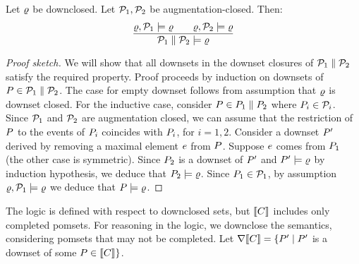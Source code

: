 \begin{proposition}%
  Let $\varrho$ be downclosed.  Let $\mathcal{P}_1, \mathcal{P}_2$ be
  augmentation\hyp{}closed. %
  Then:
  \begin{displaymath}
    \frac{
      \varrho, \mathcal{P}_1 \models\varrho
      \qquad
      \varrho, \mathcal{P}_2 \models\varrho
    }{\mathcal{P}_1 \parallel \mathcal{P}_2 \models \varrho}
  \end{displaymath}
\end{proposition}
\begin{proof}[Proof sketch]
  We will show that all downsets in the downset closures of
  $\mathcal{P}_1 \parallel \mathcal{P}_2$ satisfy the required property.  Proof proceeds
  by induction on downsets of $P \in \mathcal{P}_1 \parallel \mathcal{P}_2$.
  The case for empty downset  follows from assumption that  $\varrho$ is downset closed.  
  For the inductive case, consider %
  $P \in P_1 \parallel P_2$ where
  $P_i \in \mathcal{P}_i$.  Since $\mathcal{P}_1$ and $\mathcal{P}_2$ are augmentation
  closed, we can assume that the restriction of $P$ to the events of
  $P_i$ coincides with $P_i$, for $i=1,2$.
  Consider a downset $P'$ derived by removing a maximal element $e$ from
  $P$.  Suppose $e$ comes from $P_1$ (the other case is
  symmetric). Since $P_2$ is a downset of $P'$ and $P' \models \varrho$
  by induction hypothesis, we deduce that $P_2 \models \varrho$.
  Since $P_1 \in \mathcal{P}_1$, by assumption $\varrho, \mathcal{P}_1 \models\varrho$ we
  deduce that $P \models \varrho$.
\end{proof}

The logic is defined with respect to downclosed sets, but $\llbracket C\rrbracket$
includes only completed pomsets.  For reasoning in the logic, we downclose
the semantics, considering pomsets that may not be completed.  Let
$\nabla\llbracket C\rrbracket=\{P'\mid P'$ is a downset of some
$P \in \llbracket C\rrbracket\}$.

